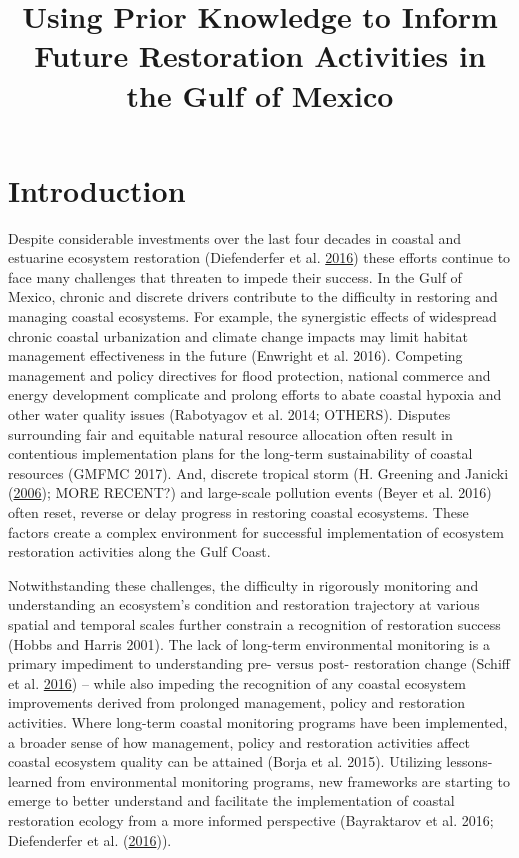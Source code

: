 \documentclass[]{article}
\title{Using Prior Knowledge to Inform Future Restoration Activities in the
Gulf of Mexico}
\author{}
\date{}
\begin{document}
\maketitle

\section{Introduction}\label{introduction}

Despite considerable investments over the last four decades in coastal
and estuarine ecosystem restoration (Diefenderfer et al.
\protect\hyperlink{ref-Diefenderfer16}{2016}) these efforts continue to
face many challenges that threaten to impede their success. In the Gulf
of Mexico, chronic and discrete drivers contribute to the difficulty in
restoring and managing coastal ecosystems. For example, the synergistic
effects of widespread chronic coastal urbanization and climate change
impacts may limit habitat management effectiveness in the future
(Enwright et al. 2016). Competing management and policy directives for
flood protection, national commerce and energy development complicate
and prolong efforts to abate coastal hypoxia and other water quality
issues (Rabotyagov et al. 2014; OTHERS). Disputes surrounding fair and
equitable natural resource allocation often result in contentious
implementation plans for the long-term sustainability of coastal
resources (GMFMC 2017). And, discrete tropical storm (H. Greening and
Janicki (\protect\hyperlink{ref-Greening06}{2006}); MORE RECENT?) and
large-scale pollution events (Beyer et al. 2016) often reset, reverse or
delay progress in restoring coastal ecosystems. These factors create a
complex environment for successful implementation of ecosystem
restoration activities along the Gulf Coast.

Notwithstanding these challenges, the difficulty in rigorously
monitoring and understanding an ecosystem's condition and restoration
trajectory at various spatial and temporal scales further constrain a
recognition of restoration success (Hobbs and Harris 2001). The lack of
long-term environmental monitoring is a primary impediment to
understanding pre- versus post- restoration change (Schiff et al.
\protect\hyperlink{ref-Schiff16}{2016}) -- while also impeding the
recognition of any coastal ecosystem improvements derived from prolonged
management, policy and restoration activities. Where long-term coastal
monitoring programs have been implemented, a broader sense of how
management, policy and restoration activities affect coastal ecosystem
quality can be attained (Borja et al. 2015). Utilizing lessons-learned
from environmental monitoring programs, new frameworks are starting to
emerge to better understand and facilitate the implementation of coastal
restoration ecology from a more informed perspective (Bayraktarov et al.
2016; Diefenderfer et al.
(\protect\hyperlink{ref-Diefenderfer16}{2016})).
\end{document}
